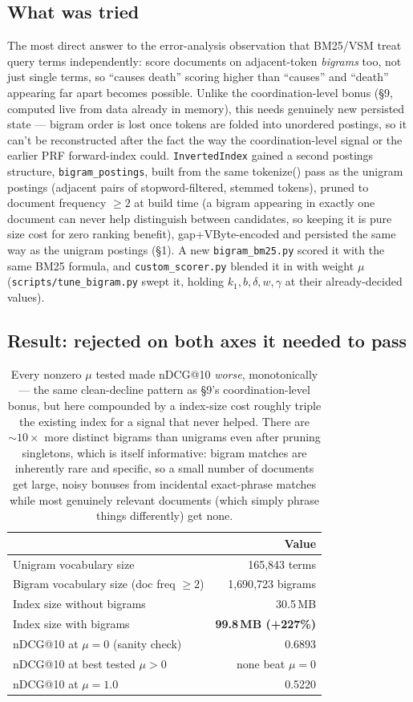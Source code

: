\documentclass[11pt]{article}
\begin{document}
\subsection{What was tried}
The most direct answer to the error-analysis observation that BM25/VSM
treat query terms independently: score documents on adjacent-token
\emph{bigrams} too, not just single terms, so ``causes death'' scoring
higher than ``causes'' and ``death'' appearing far apart becomes
possible. Unlike the coordination-level bonus (\S 9, computed live from
data already in memory), this needs genuinely new persisted state ---
bigram order is lost once tokens are folded into unordered postings, so
it can't be reconstructed after the fact the way the coordination-level
signal or the earlier PRF forward-index could. \texttt{InvertedIndex}
gained a second postings structure, \texttt{bigram\_postings}, built
from the same tokenize() pass as the unigram postings (adjacent pairs of
stopword-filtered, stemmed tokens), pruned to document frequency
$\geq 2$ at build time (a bigram appearing in exactly one document can
never help distinguish between candidates, so keeping it is pure size
cost for zero ranking benefit), gap+VByte-encoded and persisted the same
way as the unigram postings (\S 1). A new \texttt{bigram\_bm25.py} scored
it with the same BM25 formula, and \texttt{custom\_scorer.py} blended it
in with weight $\mu$ (\texttt{scripts/tune\_bigram.py} swept it, holding
$k_1,b,\delta,w,\gamma$ at their already-decided values).

\subsection{Result: rejected on both axes it needed to pass}
\begin{table}[h]
\centering
\begin{tabular}{lr}
\toprule
& Value \\
\midrule
Unigram vocabulary size & 165{,}843 terms \\
Bigram vocabulary size (doc freq $\geq 2$) & 1{,}690{,}723 bigrams \\
Index size without bigrams & 30.5\,MB \\
Index size with bigrams & \textbf{99.8\,MB (+227\%)} \\
nDCG@10 at $\mu{=}0$ (sanity check) & 0.6893 \\
nDCG@10 at best tested $\mu{>}0$ & none beat $\mu{=}0$ \\
nDCG@10 at $\mu{=}1.0$ & 0.5220 \\
\bottomrule
\end{tabular}
\caption{Every nonzero $\mu$ tested made nDCG@10 \emph{worse}, monotonically
--- the same clean-decline pattern as \S 9's coordination-level bonus,
but here compounded by a index-size cost roughly triple the existing
index for a signal that never helped. There are ${\sim}10\times$ more
distinct bigrams than unigrams even after pruning singletons, which is
itself informative: bigram matches are inherently rare and specific, so
a small number of documents get large, noisy bonuses from incidental
exact-phrase matches while most genuinely relevant documents (which
simply phrase things differently) get none.}
\end{table}
\end{document}
